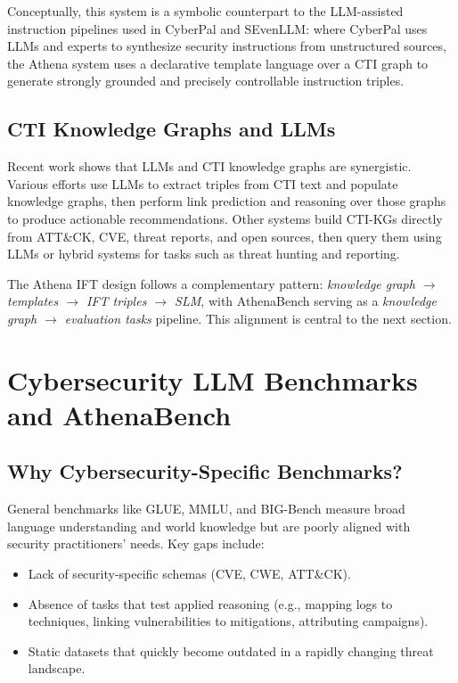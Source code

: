 \documentclass[10pt]{article}
\begin{document}
Conceptually, this system is a symbolic counterpart to the LLM-assisted instruction pipelines used in CyberPal and SEvenLLM: where CyberPal uses LLMs and experts to synthesize security instructions from unstructured sources, the Athena system uses a declarative template language over a CTI graph to generate strongly grounded and precisely controllable instruction triples.

\subsection{CTI Knowledge Graphs and LLMs}

Recent work shows that LLMs and CTI knowledge graphs are synergistic. Various efforts use LLMs to extract triples from CTI text and populate knowledge graphs, then perform link prediction and reasoning over those graphs to produce actionable recommendations.\cite{fieblinger2024kg,zhang2023cyberkg,wu2022opencykg,yu2024ctikg,zhao2024kctiaa} Other systems build CTI-KGs directly from ATT\&CK, CVE, threat reports, and open sources, then query them using LLMs or hybrid systems for tasks such as threat hunting and reporting.

The Athena IFT design follows a complementary pattern: \emph{knowledge graph $\rightarrow$ templates $\rightarrow$ IFT triples $\rightarrow$ SLM}, with AthenaBench serving as a \emph{knowledge graph $\rightarrow$ evaluation tasks} pipeline. This alignment is central to the next section.

\section{Cybersecurity LLM Benchmarks and AthenaBench}
\label{sec:benchmarks}

\subsection{Why Cybersecurity-Specific Benchmarks?}

General benchmarks like GLUE, MMLU, and BIG-Bench measure broad language understanding and world knowledge but are poorly aligned with security practitioners’ needs. Key gaps include:

\begin{itemize}[leftmargin=*]
  \item Lack of security-specific schemas (CVE, CWE, ATT\&CK).
  \item Absence of tasks that test applied reasoning (e.g., mapping logs to techniques, linking vulnerabilities to mitigations, attributing campaigns).
  \item Static datasets that quickly become outdated in a rapidly changing threat landscape.
\end{itemize}
\end{document}

